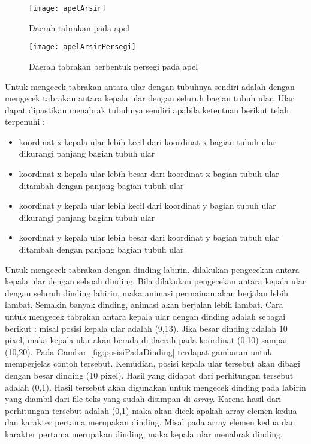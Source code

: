 \begin{figure}[H]
	\centering  
	\texttt{[image: apelArsir]}  
	\caption[Daerah tabrakan pada apel]{Daerah tabrakan pada apel}
	\label{fig:apelArsir} 
\end{figure}

\begin{figure}[H]
	\centering  
	\texttt{[image: apelArsirPersegi]}  
	\caption[Daerah tabrakan berbentuk persegi pada apel]{Daerah tabrakan berbentuk persegi pada apel}
	\label{fig:apelArsirPersegi} 
\end{figure}

Untuk mengecek tabrakan antara ular dengan tubuhnya sendiri adalah dengan mengecek tabrakan antara kepala ular dengan seluruh bagian tubuh ular. Ular dapat dipastikan menabrak tubuhnya sendiri apabila ketentuan berikut telah terpenuhi : 

\begin{itemize}
	\item koordinat x kepala ular lebih kecil dari koordinat x bagian tubuh ular dikurangi panjang bagian tubuh ular
	\item koordinat x kepala ular lebih besar dari koordinat x bagian tubuh ular ditambah dengan panjang bagian tubuh ular
	\item koordinat y kepala ular lebih kecil dari koordinat y bagian tubuh ular dikurangi panjang bagian tubuh ular
	\item koordinat y kepala ular lebih besar dari koordinat y bagian tubuh ular ditambah dengan panjang bagian tubuh ular
\end{itemize}

Untuk mengecek tabrakan dengan dinding labirin, dilakukan pengecekan antara kepala ular dengan sebuah dinding. Bila dilakukan pengecekan antara kepala ular dengan seluruh dinding labirin, maka animasi permainan akan berjalan lebih lambat. Semakin banyak dinding, animasi akan berjalan lebih lambat. Cara untuk mengecek tabrakan antara kepala ular dengan dinding adalah sebagai berikut : misal posisi kepala ular adalah (9,13). Jika besar dinding adalah 10 pixel, maka kepala ular akan berada di daerah pada koordinat (0,10) sampai (10,20). Pada Gambar~\ref{fig:posisiPadaDinding} terdapat gambaran untuk memperjelas contoh tersebut. Kemudian, posisi kepala ular tersebut akan dibagi dengan besar dinding (10 pixel). Hasil yang didapat dari perhitungan tersebut adalah (0,1). Hasil tersebut akan digunakan untuk mengecek dinding pada labirin yang diambil dari file teks yang sudah disimpan di \textit{array}. Karena hasil dari perhitungan tersebut adalah (0,1) maka akan dicek apakah array elemen kedua dan karakter pertama merupakan dinding. Misal pada array elemen kedua dan karakter pertama merupakan dinding, maka kepala ular menabrak dinding.

